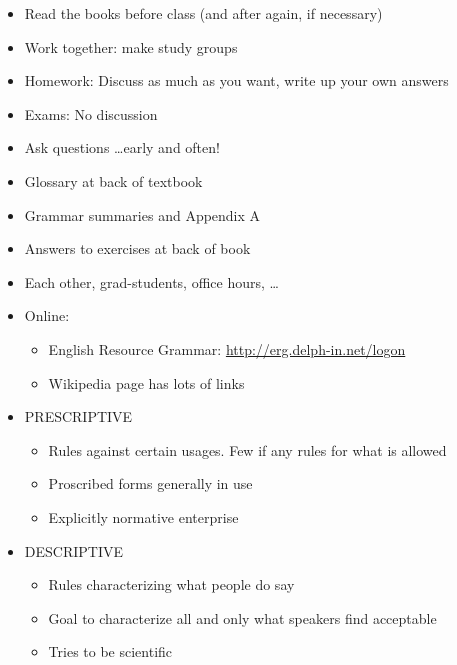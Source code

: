 \documentclass[a4paper,landscape,headrule,footrule]{foils}
\begin{document}

\begin{itemize}
\item Read the books before class (and after again, if necessary)
\item Work together: make study groups
\item Homework: Discuss as much as you want, write up your own answers
\item Exams: No discussion
\item Ask questions \ldots  early and often!
\end{itemize}

\begin{itemize}
\item Glossary at back of textbook
\item Grammar summaries and Appendix A
\item Answers to exercises at back of book
\item Each other, grad-students,  office hours, \ldots
\item Online:
  \begin{itemize}
  \item English Resource Grammar: \url{http://erg.delph-in.net/logon}
  \item Wikipedia page has lots of links
  \end{itemize}
\end{itemize}

\begin{itemize}
\item
PRESCRIPTIVE
\begin{itemize}
\item Rules against certain
usages. Few if any
rules for what is
allowed
\item Proscribed forms
generally in use
\item Explicitly normative
enterprise
\end{itemize}
\item DESCRIPTIVE
\begin{itemize}
\item Rules characterizing
what people do say
\item Goal to characterize all
and only what speakers
find acceptable
\item Tries to be scientific
\end{itemize}
\end{itemize}
\end{document}
